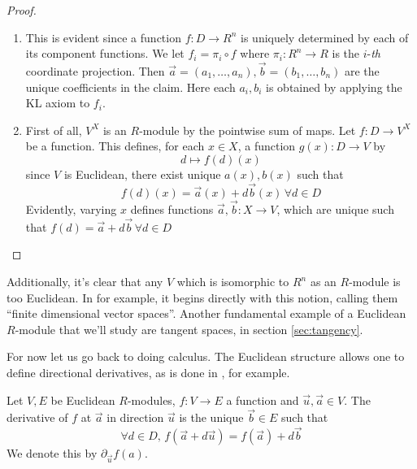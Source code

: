 \begin{proof}
  \leavevmode
  \begin{enumerate}
    \item This is evident since a function \( f:D\to R^n \) is uniquely determined by each of its component functions. We let \( f_i = \pi_i \circ{f}  \) where \( \pi_i:R^n\to R \) is the \( i \)-\textit{th} coordinate projection. Then \( \vec a=(a_1,\dots,a_n), \vec b=(b_1,\dots,b_n) \) are the unique coefficients in the claim. Here each \( a_i,b_i \) is obtained by applying the KL axiom to \( f_i \).
    \item First of all, \( V^X \) is an \( R \)-module by the pointwise sum of maps. Let \( f:D\to V^X \) be a function. This defines, for each \( x\in X \), a function \( g(x):D\to V \) by
    \begin{equation*}
      d\mapsto f(d)(x)
    \end{equation*}
    since \( V \) is Euclidean, there exist unique \( a(x), b(x) \) such that
    \begin{equation*}
      f(d)(x) = \vec a(x) + d\vec b(x)\,\forall d\in D
    \end{equation*}
    Evidently, varying \( x \) defines functions \( \vec a,\vec b:X\to V \), which are unique such that \( f(d) = \vec a + d\vec b \,\forall d\in D\)
  \end{enumerate}
\end{proof}

Additionally, it's clear that any \( V \) which is isomorphic to \( R^n \) as an \( R \)-module is too Euclidean. In \cite{kock10} for example, it begins directly with this notion, calling them ``finite dimensional vector spaces''. Another fundamental example of a Euclidean \( R \)-module that we'll study are tangent spaces, in section \ref{sec:tangency}.

For now let us go back to doing calculus. The Euclidean structure allows one to define directional derivatives, as is done in \cite{lav96}, for example.
\begin{defn}
  Let \( V,E \) be Euclidean \( R \)-modules, \( f:V\to E \) a function and \( \vec u, \vec a\in V \). The derivative of \( f \) at \( \vec a \) in direction \( \vec u \) is the unique \( \vec b\in E \) such that
  \begin{equation*}
    \forall d\in D,\, f(\vec a + d\vec u) = f(\vec a) + d\vec b
  \end{equation*}
  We denote this by \( \partial_{\vec u}f(a) \). 
\end{defn}

